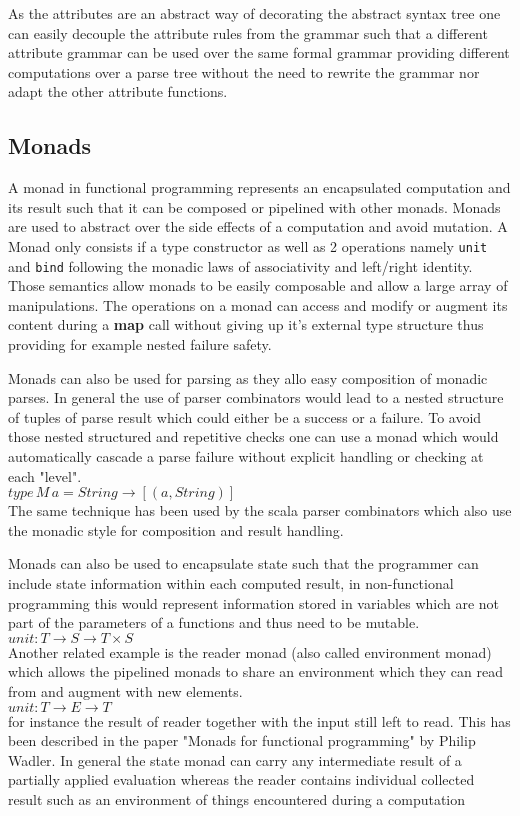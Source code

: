 As the attributes are an abstract way of decorating the abstract syntax tree one can easily decouple the attribute rules from the grammar such that a different attribute grammar can be used over the same formal grammar providing different computations over a parse tree without the need to rewrite the grammar nor adapt the other attribute functions.

\subsection{Monads}
A monad in functional programming represents an encapsulated computation and its result such that it can be composed or pipelined with other monads. Monads are used to abstract over the side effects of a computation and avoid mutation. A Monad only consists if a type constructor as well as 2 operations namely \verb/unit/ and \verb/bind/ following the monadic laws of associativity and left/right identity. Those semantics allow monads to be easily composable and allow a large array of manipulations. The operations on a monad can access and modify or augment its content during a \textbf{map} call without giving up it's external type structure thus providing for example nested failure safety.
 
Monads can also be used for parsing as they allo easy composition of monadic parses. In general the use of parser combinators would lead to a nested structure of tuples of parse result which could either be a success or a failure. To avoid those nested structured and repetitive checks one can use a monad which would automatically cascade a parse failure without explicit handling or checking at each "level".\\
$type\, M\, a = String \rightarrow [(a, String)]$\\
The same technique has been used by the scala parser combinators which also use the monadic style for composition and result handling.

Monads can also be used to encapsulate state such that the programmer can include state information within each computed result, in non-functional programming this would represent information stored in variables which are not part of the parameters of a functions and thus need to be mutable.\\
$unit: T \rightarrow S \rightarrow T \times S $\\
Another related example is the reader monad (also called environment monad) which allows the pipelined monads to share an environment which they can read from and augment with new elements.\\
$unit: T \rightarrow E \rightarrow T $\\
for instance the result of reader together with the input still left to read. This has been described in the paper "Monads for functional programming"\cite{monads} by Philip Wadler. In general the state monad can carry any intermediate result of a partially applied evaluation whereas the reader contains individual collected result such as an environment of things encountered during a computation

